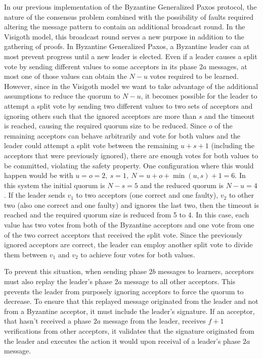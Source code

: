 In our previous implementation of the Byzantine Generalized Paxos protocol, the nature of the consensus problem combined with the possibility of faults required altering the message pattern to contain an additional broadcast round. In the Visigoth model, this broadcast round serves a new purpose in addition to the gathering of proofs. In Byzantine Generalized Paxos, a Byzantine leader can at most prevent progress until a new leader is elected. Even if a leader causes a split vote by sending different values to some acceptors in its phase $2a$ messages, at most one of those values can obtain the $N-u$ votes required to be learned. However, since in the Visigoth model we want to take advantage of the additional assumptions to reduce the quorum to $N-u$, it becomes possible for the leader to attempt a split vote by sending two different values to two sets of acceptors and ignoring others such that the ignored acceptors are more than $s$ and the timeout is reached, causing the required quorum size to be reduced. Since $o$ of the remaining acceptors can behave arbitrarily and vote for both values and the leader could attempt a split vote between the remaining $u+s+1$ (including the acceptors that were previously ignored), there are enough votes for both values to be committed, violating the safety property. One configuration where this would happen would be with $u=o=2,\ s=1,\ N=u+o+\min(u,s)+1=6$. In this system the initial quorum is $N-s=5$ and the reduced quorum is $N-u=4$. If the leader sends $v_1$ to two acceptors (one correct and one faulty), $v_2$ to other two (also one correct and one faulty) and ignores the last two, then the timeout is reached and the required quorum size is reduced from 5 to 4. In this case, each value has two votes from both of the Byzantine acceptors and one vote from one of the two correct acceptors that received the split vote. Since the previously ignored acceptors are correct, the leader can employ another split vote to divide them between $v_1$ and $v_2$ to achieve four votes for both values. \par
To prevent this situation, when sending phase $2b$ messages to learners, acceptors must also replay the leader's phase $2a$ message to all other acceptors. This prevents the leader from purposely ignoring acceptors to force the quorum to decrease. To ensure that this replayed message originated from the leader and not from a Byzantine acceptor, it must include the leader's signature. If an acceptor, that hasn't received a phase $2a$ message from the leader, receives $f+1$ verifications from other acceptors, it validates that the signature originated from the leader and executes the action it would upon receival of a leader's phase $2a$ message.


